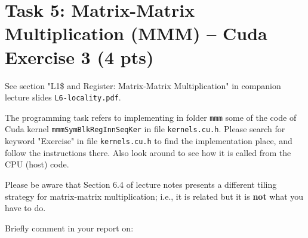\documentclass{article}
\begin{document}
\section{Task 5: Matrix-Matrix Multiplication (MMM) -- Cuda Exercise 3  (4 pts)}

See section "L1\$ and Register: Matrix-Matrix Multiplication" in companion lecture slides \texttt{L6-locality.pdf}.

The programming task refers to implementing in folder \texttt{mmm} some of the code of Cuda kernel \texttt{mmmSymBlkRegInnSeqKer} in file \texttt{kernels.cu.h}. Please search for keyword "Exercise" in file \texttt{kernels.cu.h} to find the implementation place, and follow the instructions there. Also look around to see how it is called from the CPU (host) code.

Please be aware that Section 6.4 of lecture notes presents a different tiling
strategy for matrix-matrix multiplication; i.e., it is related but it is \textbf{not}
what you have to do.

Briefly comment in your report on:
\end{document}
